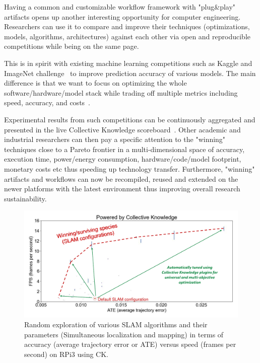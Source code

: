 Having a common and customizable workflow framework with "plug\&play" artifacts 
opens up another interesting opportunity for computer engineering.
%
Researchers can use it to compare and improve their techniques
(optimizations, models, algorithms, architectures) 
against each other via open and reproducible competitions
while being on the same page.

This is in spirit with existing machine learning competitions
such as Kaggle and ImageNet challenge~\cite{kaggle,imagenet-challenge} 
to improve prediction accuracy of various models.
%
The main difference is that we want to focus on 
optimizing the whole software/hardware/model stack 
while trading off multiple metrics including speed, accuracy,
and costs~\cite{request,cm:29db2248aba45e59:cd11e3a188574d80,lpirc}.

Experimental results from such competitions can be continuously aggregated 
and presented in the live Collective Knowledge scoreboard~\cite{live-ck-repo}.
%
Other academic and industrial researchers can then pay 
a specific attention to the "winning" techniques close 
to a Pareto frontier in a multi-dimensional 
space of accuracy, execution time, power/energy consumption, 
hardware/code/model footprint, monetary costs etc
thus speeding up technology transfer.
%
Furthermore, "winning" artifacts and workflows can now be recompiled,
reused and extended on the newer platforms with the latest
environment thus improving overall research sustainability.

   \begin{figure}[!htbp]
     \centering
      \includegraphics[width=5.8in]
      {ck-assets/37f1624d4b8b53d6-cropped.pdf} %
     \caption{
      Random exploration of various SLAM algorithms and their parameters (Simultaneous localization and mapping)
      in terms of accuracy (average trajectory error or ATE) versus speed 
      (frames per second) on RPi3 using CK.
     }                                         
     \label{fig:converting-ad-hoc-slambench-to-ck}
   \end{figure}

